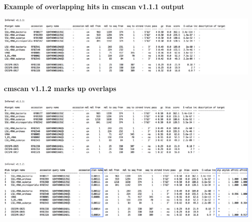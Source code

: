 \documentclass[landscape]{slides}
\begin{document}
\begin{slide}
\begin{center}
\textbf{Example of overlapping hits in cmscan v1.1.1 output} \\

\medskip
\medskip

\includegraphics[width=10in]{figs/overlap-examples-1p1p1}

\end{center}

\vfill
\end{slide}
\begin{slide}
\begin{center}
\textbf{cmscan v1.1.2 marks up overlaps} \\

\medskip
\medskip

\includegraphics[width=10in]{figs/overlap-examples}

\end{center}

\vfill
\end{slide}

\end{document}

